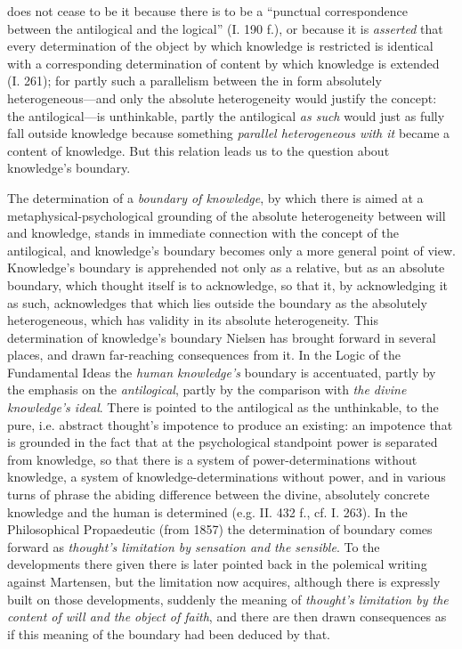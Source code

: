 \documentclass[12pt,a4paper]{book}
\begin{document}
does not cease to be it because there is to be a ``punctual correspondence between the antilogical and
the logical'' (I. 190 f.), or because it is \emph{asserted} that every determination of the object by which
knowledge is restricted is identical with a corresponding determination of content by which knowledge
is extended (I. 261); for partly such a parallelism between the in form absolutely heterogeneous---and
only the absolute heterogeneity would justify the concept: the antilogical---is unthinkable, partly the
antilogical \emph{as such} would just as fully fall outside knowledge because something \emph{parallel
heterogeneous with it} became a content of knowledge. But this relation leads us to the question about
knowledge's boundary.

The determination of a \emph{boundary of knowledge}, by which there is aimed at a
metaphysical-psychological grounding of the absolute heterogeneity between will and knowledge, stands
in immediate connection with the concept of the antilogical, and knowledge's boundary becomes only a
more general point of view. Knowledge's boundary is apprehended not only as a relative, but as an
absolute boundary, which thought itself is to acknowledge, so that it, by acknowledging it as such,
acknowledges that which lies outside the boundary as the absolutely heterogeneous, which has validity
in its absolute heterogeneity. This determination of knowledge's boundary Nielsen has brought forward
in several places, and drawn far-reaching consequences from it. In the Logic of the Fundamental Ideas
the \emph{human knowledge's} boundary is accentuated, partly by the emphasis on the \emph{antilogical}, partly
by the comparison with \emph{the divine knowledge's ideal}. There is pointed to the antilogical as the
unthinkable, to the pure, i.e. abstract thought's impotence to produce an existing: an impotence that
is grounded in the fact that at the psychological standpoint power is separated from knowledge, so that
there is a system of power-determinations without knowledge, a system of knowledge-determinations
without power, and in various turns of phrase the abiding difference between the divine, absolutely
concrete knowledge and the human is determined (e.g. II. 432 f., cf. I. 263). In the Philosophical
Propaedeutic (from 1857) the determination of boundary comes forward as \emph{thought's limitation by
sensation and the sensible}. To the developments there given there is later pointed back in the polemical
writing against Martensen, but the limitation now acquires, although there is expressly built on those
developments, suddenly the meaning of \emph{thought's limitation by the content of will and the object
of faith}, and there are then drawn consequences as if this meaning of the boundary had been deduced by
that.
\end{document}
